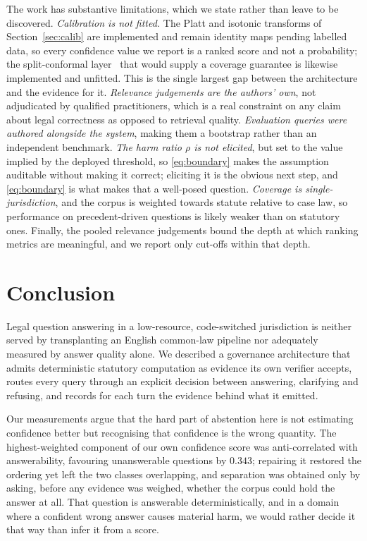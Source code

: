 \documentclass[conference]{IEEEtran}
\begin{document}
The work has substantive limitations, which we state rather than leave to be
discovered. \emph{Calibration is not fitted.} The Platt and isotonic transforms
of Section~\ref{sec:calib} are implemented and remain identity maps pending
labelled data, so every confidence value we report is a ranked score and not a
probability; the split-conformal layer~\cite{angelopoulos2021conformal} that
would supply a coverage guarantee is likewise implemented and unfitted. This is
the single largest gap between the architecture and the evidence for it.
\emph{Relevance judgements are the authors' own}, not adjudicated by qualified
practitioners, which is a real constraint on any claim about legal correctness
as opposed to retrieval quality. \emph{Evaluation queries were authored
alongside the system}, making them a bootstrap rather than an independent
benchmark. \emph{The harm ratio $\rho$ is not elicited}, but set to the value implied by
the deployed threshold, so \eqref{eq:boundary} makes the assumption auditable
without making it correct; eliciting it is the obvious next step, and
\eqref{eq:boundary} is what makes that a well-posed question. \emph{Coverage is single-jurisdiction},
and the corpus is weighted towards statute relative to case law, so performance
on precedent-driven questions is likely weaker than on statutory ones. Finally,
the pooled relevance judgements bound the depth at which ranking metrics are
meaningful, and we report only cut-offs within that depth.

\section{Conclusion}
Legal question answering in a low-resource, code-switched jurisdiction is
neither served by transplanting an English common-law pipeline nor adequately
measured by answer quality alone. We described a governance architecture that
admits deterministic statutory computation as evidence its own verifier accepts,
routes every query through an explicit decision between answering, clarifying
and refusing, and records for each turn the evidence behind what it emitted.

Our measurements argue that the hard part of abstention here is not estimating
confidence better but recognising that confidence is the wrong quantity. The
highest-weighted component of our own confidence score was anti-correlated with
answerability, favouring unanswerable questions by $0.343$; repairing it
restored the ordering yet left the two classes overlapping, and separation was
obtained only by asking, before any evidence was weighed, whether the corpus
could hold the answer at all. That question is answerable deterministically, and
in a domain where a confident wrong answer causes material harm, we would rather
decide it that way than infer it from a score.
\end{document}

